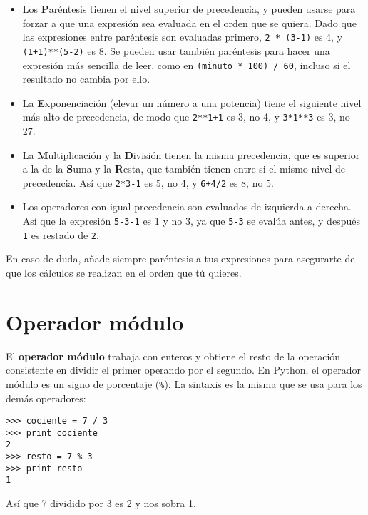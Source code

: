 \begin{itemize}

\item Los {\bf P}aréntesis tienen el nivel superior de precedencia, y pueden usarse
para forzar a que una expresión sea evaluada en el orden que se quiera. Dado
que las expresiones entre paréntesis son evaluadas primero, {\tt 2 * (3-1)} es 4,
y {\tt (1+1)**(5-2)} es 8. Se pueden usar también paréntesis para hacer una
expresión más sencilla de leer, como en {\tt (minuto * 100) / 60}, incluso
si el resultado no cambia por ello.

\item La {\bf E}xponenciación (elevar un número a una potencia) tiene el siguiente nivel más alto de
precedencia, de modo que {\tt 2**1+1} es 3, no 4, y {\tt 3*1**3} es 3, no 27.

\item La {\bf M}ultiplicación y la {\bf D}ivisión tienen la misma precedencia,
que es superior a la de la {\bf S}uma y la {\bf R}esta, que también tienen entre si el mismo
nivel de precedencia. Así que {\tt 2*3-1} es 5, no 4, y
{\tt 6+4/2} es 8, no 5.

\item Los operadores con igual precedencia son evaluados de izquierda a
derecha. Así que la expresión {\tt 5-3-1} es 1 y no 3, ya que
{\tt 5-3} se evalúa antes, y después {\tt 1} es restado de {\tt 2}.

\end{itemize}

En caso de duda, añade siempre paréntesis a tus expresiones para asegurarte
de que los cálculos se realizan en el orden que tú quieres.

\section{Operador módulo}


El {\bf operador módulo} trabaja con enteros y obtiene el resto
de la operación consistente en dividir el primer operando por el segundo. En Python, el
operador módulo es un signo de porcentaje (\verb"%"). La sintaxis es la misma
que se usa para los demás operadores:

\beforeverb
\begin{verbatim}
>>> cociente = 7 / 3
>>> print cociente
2
>>> resto = 7 % 3
>>> print resto
1
\end{verbatim}
\afterverb
%
Así que 7 dividido por 3 es 2 y nos sobra 1. 


